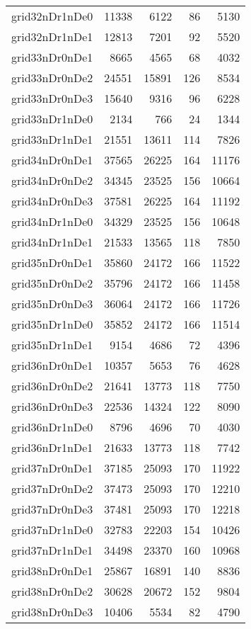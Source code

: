 \begin{longtable}{lrrrr}
grid32nDr1nDe0 & 11338 & 6122 & 86 & 5130 \\
grid32nDr1nDe1 & 12813 & 7201 & 92 & 5520 \\
grid33nDr0nDe1 & 8665 & 4565 & 68 & 4032 \\
grid33nDr0nDe2 & 24551 & 15891 & 126 & 8534 \\
grid33nDr0nDe3 & 15640 & 9316 & 96 & 6228 \\
grid33nDr1nDe0 & 2134 & 766 & 24 & 1344 \\
grid33nDr1nDe1 & 21551 & 13611 & 114 & 7826 \\
grid34nDr0nDe1 & 37565 & 26225 & 164 & 11176 \\
grid34nDr0nDe2 & 34345 & 23525 & 156 & 10664 \\
grid34nDr0nDe3 & 37581 & 26225 & 164 & 11192 \\
grid34nDr1nDe0 & 34329 & 23525 & 156 & 10648 \\
grid34nDr1nDe1 & 21533 & 13565 & 118 & 7850 \\
grid35nDr0nDe1 & 35860 & 24172 & 166 & 11522 \\
grid35nDr0nDe2 & 35796 & 24172 & 166 & 11458 \\
grid35nDr0nDe3 & 36064 & 24172 & 166 & 11726 \\
grid35nDr1nDe0 & 35852 & 24172 & 166 & 11514 \\
grid35nDr1nDe1 & 9154 & 4686 & 72 & 4396 \\
grid36nDr0nDe1 & 10357 & 5653 & 76 & 4628 \\
grid36nDr0nDe2 & 21641 & 13773 & 118 & 7750 \\
grid36nDr0nDe3 & 22536 & 14324 & 122 & 8090 \\
grid36nDr1nDe0 & 8796 & 4696 & 70 & 4030 \\
grid36nDr1nDe1 & 21633 & 13773 & 118 & 7742 \\
grid37nDr0nDe1 & 37185 & 25093 & 170 & 11922 \\
grid37nDr0nDe2 & 37473 & 25093 & 170 & 12210 \\
grid37nDr0nDe3 & 37481 & 25093 & 170 & 12218 \\
grid37nDr1nDe0 & 32783 & 22203 & 154 & 10426 \\
grid37nDr1nDe1 & 34498 & 23370 & 160 & 10968 \\
grid38nDr0nDe1 & 25867 & 16891 & 140 & 8836 \\
grid38nDr0nDe2 & 30628 & 20672 & 152 & 9804 \\
grid38nDr0nDe3 & 10406 & 5534 & 82 & 4790 \\

\end{longtable}
